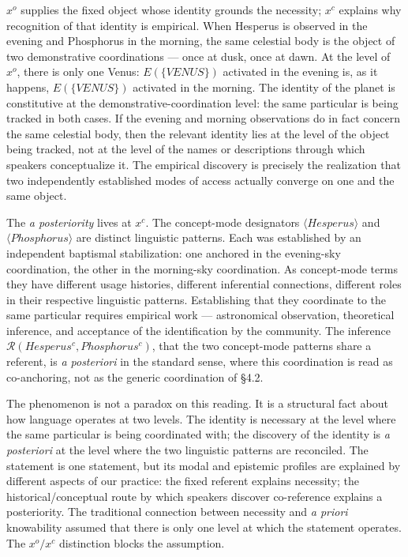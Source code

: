 \documentclass[12pt,a4paper]{article}
\begin{document}
\(x^o\) supplies the fixed object whose identity grounds the necessity; \(x^c\) explains why recognition of that identity is empirical. When Hesperus is observed in the evening and Phosphorus in the morning, the same celestial body is the object of two demonstrative coordinations --- once at dusk, once at dawn. At the level of \(x^o\), there is only one Venus: \(E(\{VENUS\})\) activated in the evening is, as it happens, \(E(\{VENUS\})\) activated in the morning. The identity of the planet is constitutive at the demonstrative-coordination level: the same particular is being tracked in both cases. If the evening and morning observations do in fact concern the same celestial body, then the relevant identity lies at the level of the object being tracked, not at the level of the names or descriptions through which speakers conceptualize it. The empirical discovery is precisely the realization that two independently established modes of access actually converge on one and the same object.

The \emph{a posteriority} lives at \(x^c\). The concept-mode designators \(\langle Hesperus \rangle\) and \(\langle Phosphorus \rangle\) are distinct linguistic patterns. Each was established by an independent baptismal stabilization: one anchored in the evening-sky coordination, the other in the morning-sky coordination. As concept-mode terms they have different usage histories, different inferential connections, different roles in their respective linguistic patterns. Establishing that they coordinate to the same particular requires empirical work --- astronomical observation, theoretical inference, and acceptance of the identification by the community. The inference \(\mathcal{R}(Hesperus^c, Phosphorus^c)\), that the two concept-mode patterns share a referent, is \emph{a posteriori} in the standard sense, where this coordination is read as co-anchoring, not as the generic coordination of §4.2.

The phenomenon is not a paradox on this reading. It is a structural fact about how language operates at two levels. The identity is necessary at the level where the same particular is being coordinated with; the discovery of the identity is \emph{a posteriori} at the level where the two linguistic patterns are reconciled. The statement is one statement, but its modal and epistemic profiles are explained by different aspects of our practice: the fixed referent explains necessity; the historical/conceptual route by which speakers discover co-reference explains a posteriority. The traditional connection between necessity and \emph{a priori} knowability assumed that there is only one level at which the statement operates. The \(x^o/x^c\) distinction blocks the assumption.
\end{document}

